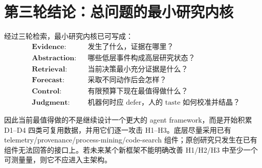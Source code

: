 \documentclass[11pt,a4paper]{ctexart}
\begin{document}
\section{第三轮结论：总问题的最小研究内核}

经过三轮检索，最小研究内核已可写成：
\begin{equation}
\boxed{
\begin{aligned}
&\textbf{Evidence}: &&\text{发生了什么，证据在哪里？}\\
&\textbf{Abstraction}: &&\text{哪些低层事件构成高层研究状态？}\\
&\textbf{Retrieval}: &&\text{当前决策最小充分证据是什么？}\\
&\textbf{Forecast}: &&\text{采取不同动作后会怎样？}\\
&\textbf{Control}: &&\text{有限预算下现在最值得做什么？}\\
&\textbf{Judgment}: &&\text{机器何时应 defer，人的 taste 如何校准并结晶？}
\end{aligned}}
\end{equation}

因此当前最值得做的不是继续设计一个更大的 agent framework，而是开始积累 D1--D4 四类可复用数据，并用它们逐一攻击 H1--H3。底层尽量采用已有 telemetry/provenance/process-mining/code-search 组件；原创研究只发生在已有组件无法回答的接口上。若未来某个新框架不能明确改善 H1/H2/H3 中至少一个可测量量，则它不应进入主架构。

\printbibliography
\end{document}
